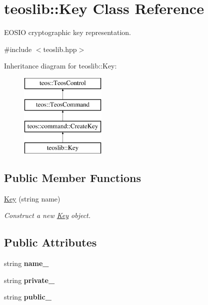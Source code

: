 \hypertarget{classteoslib_1_1_key}{}\section{teoslib\+:\+:Key Class Reference}
\label{classteoslib_1_1_key}


E\+O\+S\+IO cryptographic key representation.  




{\ttfamily \#include $<$teoslib.\+hpp$>$}

Inheritance diagram for teoslib\+:\+:Key\+:\begin{figure}[H]
\begin{center}
\leavevmode
\includegraphics[height=4.000000cm]{classteoslib_1_1_key}
\end{center}
\end{figure}
\subsection*{Public Member Functions}
\begin{DoxyCompactItemize}
\item 
\mbox{\hyperlink{classteoslib_1_1_key_a7c296035add9fcd2fee9fbbf118df3a7}{Key}} (string name)
\begin{DoxyCompactList}\small\item\em Construct a new \mbox{\hyperlink{classteoslib_1_1_key}{Key}} object. \end{DoxyCompactList}\end{DoxyCompactItemize}
\subsection*{Public Attributes}
\begin{DoxyCompactItemize}
\item 
\mbox{\label{classteoslib_1_1_key_a15d1d7c5cf5b92ae39a9b99446fa1883}} 
string {\bfseries name\+\_\+}
\item 
\mbox{\label{classteoslib_1_1_key_ae63a5c3bd28a24bb1d54f0e6170d358d}} 
string {\bfseries private\+\_\+}
\item 
\mbox{\label{classteoslib_1_1_key_a2b2ccda06afa6c19b770636628399208}} 
string {\bfseries public\+\_\+}
\end{DoxyCompactItemize}

